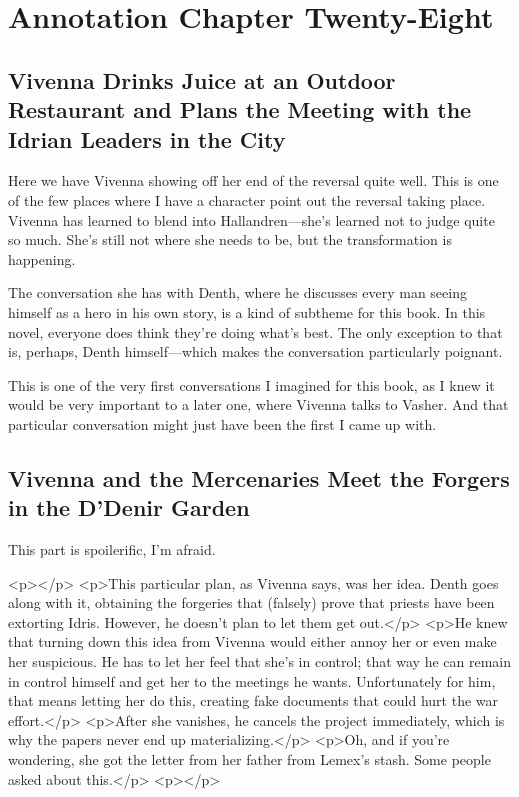 \section{Annotation Chapter Twenty-Eight}

\subsection*{Vivenna Drinks Juice at an Outdoor Restaurant and Plans the Meeting with the Idrian Leaders in the City}

Here we have Vivenna showing off her end of the reversal quite well. This is one of the few places where I have a character point out the reversal taking place. Vivenna has learned to blend into Hallandren—she’s learned not to judge quite so much. She’s still not where she needs to be, but the transformation is happening.

The conversation she has with Denth, where he discusses every man seeing himself as a hero in his own story, is a kind of subtheme for this book. In this novel, everyone does think they’re doing what’s best. The only exception to that is, perhaps, Denth himself—which makes the conversation particularly poignant.

This is one of the very first conversations I imagined for this book, as I knew it would be very important to a later one, where Vivenna talks to Vasher. And that particular conversation might just have been the first I came up with.

\subsection*{Vivenna and the Mercenaries Meet the Forgers in the D’Denir Garden}

This part is spoilerific, I’m afraid.



<p></p>
<p>This particular plan, as Vivenna says, was her idea. Denth goes along with it, obtaining the forgeries that (falsely) prove that priests have been extorting Idris. However, he doesn’t plan to let them get out.</p>
<p>He knew that turning down this idea from Vivenna would either annoy her or even make her suspicious. He has to let her feel that she’s in control; that way he can remain in control himself and get her to the meetings he wants. Unfortunately for him, that means letting her do this, creating fake documents that could hurt the war effort.</p>
<p>After she vanishes, he cancels the project immediately, which is why the papers never end up materializing.</p>
<p>Oh, and if you’re wondering, she got the letter from her father from Lemex’s stash. Some people asked about this.</p>
<p></p>

